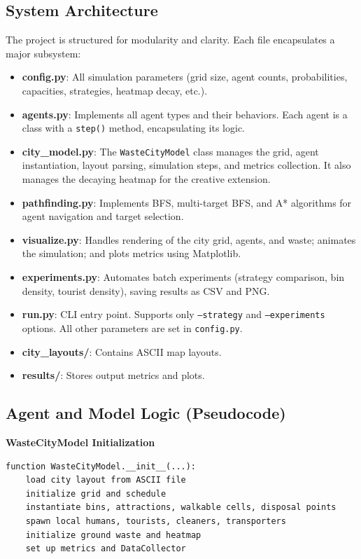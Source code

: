 \documentclass[12pt,a4paper]{article}
\begin{document}
\subsection*{System Architecture}
The project is structured for modularity and clarity. Each file encapsulates a major subsystem:
\begin{itemize}
    \item \textbf{config.py}: All simulation parameters (grid size, agent counts, probabilities, capacities, strategies, heatmap decay, etc.).
    \item \textbf{agents.py}: Implements all agent types and their behaviors. Each agent is a class with a \texttt{step()} method, encapsulating its logic.
    \item \textbf{city_model.py}: The \texttt{WasteCityModel} class manages the grid, agent instantiation, layout parsing, simulation steps, and metrics collection. It also manages the decaying heatmap for the creative extension.
    \item \textbf{pathfinding.py}: Implements BFS, multi-target BFS, and A* algorithms for agent navigation and target selection.
    \item \textbf{visualize.py}: Handles rendering of the city grid, agents, and waste; animates the simulation; and plots metrics using Matplotlib.
    \item \textbf{experiments.py}: Automates batch experiments (strategy comparison, bin density, tourist density), saving results as CSV and PNG.
    \item \textbf{run.py}: CLI entry point. Supports only \texttt{--strategy} and \texttt{--experiments} options. All other parameters are set in \texttt{config.py}.
    \item \textbf{city_layouts/}: Contains ASCII map layouts.
    \item \textbf{results/}: Stores output metrics and plots.
\end{itemize}

\subsection*{Agent and Model Logic (Pseudocode)}
\textbf{WasteCityModel Initialization}
\begin{verbatim}
function WasteCityModel.__init__(...):
    load city layout from ASCII file
    initialize grid and schedule
    instantiate bins, attractions, walkable cells, disposal points
    spawn local humans, tourists, cleaners, transporters
    initialize ground waste and heatmap
    set up metrics and DataCollector
\end{verbatim}
\end{document}

